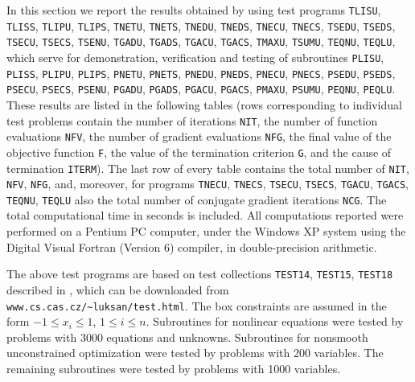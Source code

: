 \documentclass{esub2acm}
\begin{document}
\vspace{3mm}

\noindent In this section we report the results obtained by using test programs
{\tt TLISU}, {\tt TLISS}, {\tt TLIPU}, {\tt TLIPS}, {\tt TNETU}, {\tt TNETS},
{\tt TNEDU}, {\tt TNEDS}, {\tt TNECU}, {\tt TNECS}, {\tt TSEDU}, {\tt TSEDS},
{\tt TSECU}, {\tt TSECS}, {\tt TSENU}, {\tt TGADU}, {\tt TGADS}, {\tt TGACU},
{\tt TGACS}, {\tt TMAXU}, {\tt TSUMU}, {\tt TEQNU}, {\tt TEQLU},
which serve for demonstration, verification and testing of subroutines
{\tt PLISU}, {\tt PLISS}, {\tt PLIPU}, {\tt PLIPS}, {\tt PNETU}, {\tt PNETS},
{\tt PNEDU}, {\tt PNEDS}, {\tt PNECU}, {\tt PNECS}, {\tt PSEDU}, {\tt PSEDS},
{\tt PSECU}, {\tt PSECS}, {\tt PSENU}, {\tt PGADU}, {\tt PGADS}, {\tt PGACU},
{\tt PGACS}, {\tt PMAXU}, {\tt PSUMU}, {\tt PEQNU}, {\tt PEQLU}.
These results are listed in the following tables (rows corresponding to individual
test problems contain the number of iterations {\tt NIT}, the number of function
evaluations {\tt NFV}, the number of gradient evaluations {\tt NFG}, the final value
of the objective function {\tt F}, the value of the termination criterion {\tt G},
and the cause of termination {\tt ITERM}). The last row of every table contains
the total number of {\tt NIT}, {\tt NFV}, {\tt NFG}, and, moreover, for programs
{\tt TNECU}, {\tt TNECS}, {\tt TSECU}, {\tt TSECS}, {\tt TGACU}, {\tt TGACS},
{\tt TEQNU}, {\tt TEQLU} also the total number of conjugate gradient iterations
{\tt NCG}. The total computational time in seconds is included. All computations
reported were performed on a Pentium PC computer, under the Windows
XP system using the Digital Visual Fortran (Version 6) compiler,
in double-precision arithmetic. %

The above test programs are based on test collections {\tt TEST14},
{\tt TEST15}, {\tt TEST18} described in \cite{luv1}, which can be downloaded
from {\tt www.cs.cas.cz/\~{}luksan/test.html}. The box constraints are
assumed in the form $-1 \leq x_i \leq 1$, $1 \leq i \leq n$. Subroutines
for nonlinear equations were tested by problems with 3000 equations
and unknowns. Subroutines for nonsmooth unconstrained optimization were
tested by problems with 200 variables. The remaining subroutines were
tested by problems with 1000 variables.

\newpage

\renewcommand{\arraystretch}{1}
\end{document}
